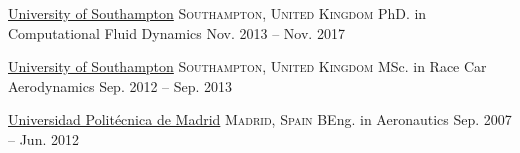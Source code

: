 \documentclass[10pt,a4paper]{article}
\begin{document}
\spacedhrule{2pt}{2pt}


\headedsection
  {\href{https://www.southampton.ac.uk}{University of Southampton}}
  {\textsc{Southampton, United Kingdom}} {%
  \headedsubsection
    {PhD. in Computational Fluid Dynamics}
    {Nov. 2013 -- Nov. 2017}{}}

\headedsection
  {\href{https://www.southampton.ac.uk}{University of Southampton}}
  {\textsc{Southampton, United Kingdom}} {%
  \headedsubsection
    {MSc. in Race Car Aerodynamics}
    {Sep. 2012 -- Sep. 2013}{}}

\headedsection
  {\href{https://www.euita.upm.es}{Universidad Polit\'ecnica de Madrid}}
  {\textsc{Madrid, Spain}} {%
  \headedsubsection
    {BEng. in Aeronautics}
    {Sep. 2007 -- Jun. 2012}{}}

\spacedhrule{20pt}{2pt}

\end{document}

